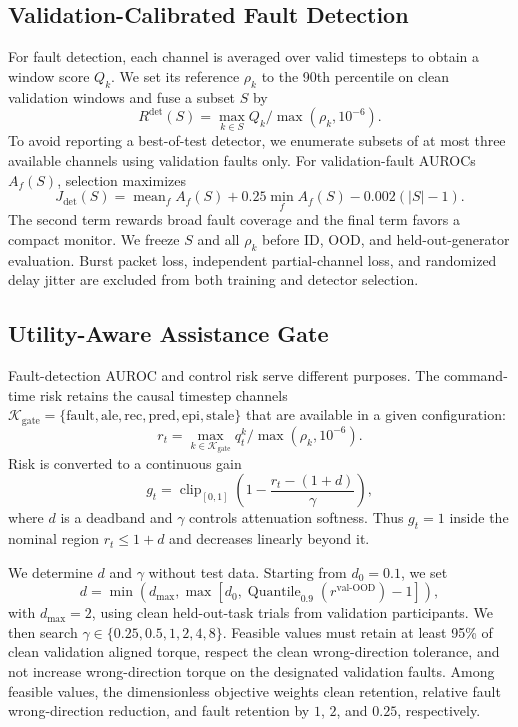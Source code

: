 \documentclass[letterpaper]{article} %
\begin{document}
\subsection{Validation-Calibrated Fault Detection}

For fault detection, each channel is averaged over valid timesteps to obtain a window score $Q_k$.
We set its reference $\rho_k$ to the 90th percentile on clean validation windows and fuse a subset $S$ by
\begin{equation}
    R^{\mathrm{det}}(S) = \max_{k\in S} Q_k/\max(\rho_k,10^{-6}).
\end{equation}
To avoid reporting a best-of-test detector, we enumerate subsets of at most three available channels using validation faults only.
For validation-fault AUROCs $A_f(S)$, selection maximizes
\begin{equation}
    J_{\mathrm{det}}(S)=\operatorname{mean}_f A_f(S)
    +0.25\min_f A_f(S)-0.002(|S|-1).
\end{equation}
The second term rewards broad fault coverage and the final term favors a compact monitor.
We freeze $S$ and all $\rho_k$ before ID, OOD, and held-out-generator evaluation.
Burst packet loss, independent partial-channel loss, and randomized delay jitter are excluded from both training and detector selection.

\subsection{Utility-Aware Assistance Gate}

Fault-detection AUROC and control risk serve different purposes.
The command-time risk retains the causal timestep channels
$\mathcal{K}_{\mathrm{gate}}=\{\mathrm{fault},\mathrm{ale},\mathrm{rec},\mathrm{pred},\mathrm{epi},\mathrm{stale}\}$ that are available in a given configuration:
\begin{equation}
    r_t=\max_{k\in\mathcal{K}_{\mathrm{gate}}}
    q_t^k/\max(\rho_k,10^{-6}).
\end{equation}
Risk is converted to a continuous gain
\begin{equation}
g_t = \operatorname{clip}_{[0,1]}\!\left(
1-\frac{r_t-(1+d)}{\gamma}\right),
\end{equation}
where $d$ is a deadband and $\gamma$ controls attenuation softness.
Thus $g_t=1$ inside the nominal region $r_t\leq1+d$ and decreases linearly beyond it.

We determine $d$ and $\gamma$ without test data.
Starting from $d_0=0.1$, we set
\begin{equation}
    d=\min\!\left(d_{\max},\max\left[d_0,
    \operatorname{Quantile}_{0.9}(r^{\mathrm{val\text{-}OOD}})-1\right]\right),
\end{equation}
with $d_{\max}=2$, using clean held-out-task trials from validation participants.
We then search $\gamma\in\{0.25,0.5,1,2,4,8\}$.
Feasible values must retain at least 95\% of clean validation aligned torque, respect the clean wrong-direction tolerance, and not increase wrong-direction torque on the designated validation faults.
Among feasible values, the dimensionless objective weights clean retention, relative fault wrong-direction reduction, and fault retention by $1$, $2$, and $0.25$, respectively.
\end{document}
